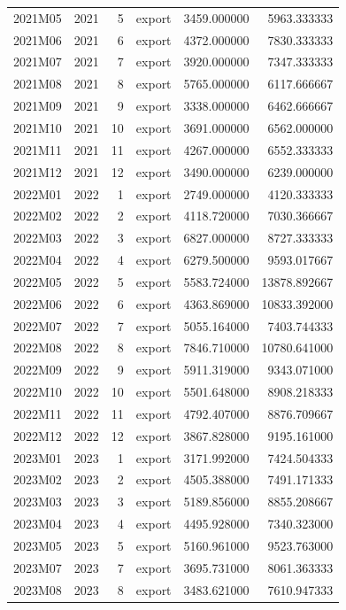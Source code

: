 \begin{tabular}{lrrlrr}
2021M05 & 2021 & 5 & export & 3459.000000 & 5963.333333 \\
2021M06 & 2021 & 6 & export & 4372.000000 & 7830.333333 \\
2021M07 & 2021 & 7 & export & 3920.000000 & 7347.333333 \\
2021M08 & 2021 & 8 & export & 5765.000000 & 6117.666667 \\
2021M09 & 2021 & 9 & export & 3338.000000 & 6462.666667 \\
2021M10 & 2021 & 10 & export & 3691.000000 & 6562.000000 \\
2021M11 & 2021 & 11 & export & 4267.000000 & 6552.333333 \\
2021M12 & 2021 & 12 & export & 3490.000000 & 6239.000000 \\
2022M01 & 2022 & 1 & export & 2749.000000 & 4120.333333 \\
2022M02 & 2022 & 2 & export & 4118.720000 & 7030.366667 \\
2022M03 & 2022 & 3 & export & 6827.000000 & 8727.333333 \\
2022M04 & 2022 & 4 & export & 6279.500000 & 9593.017667 \\
2022M05 & 2022 & 5 & export & 5583.724000 & 13878.892667 \\
2022M06 & 2022 & 6 & export & 4363.869000 & 10833.392000 \\
2022M07 & 2022 & 7 & export & 5055.164000 & 7403.744333 \\
2022M08 & 2022 & 8 & export & 7846.710000 & 10780.641000 \\
2022M09 & 2022 & 9 & export & 5911.319000 & 9343.071000 \\
2022M10 & 2022 & 10 & export & 5501.648000 & 8908.218333 \\
2022M11 & 2022 & 11 & export & 4792.407000 & 8876.709667 \\
2022M12 & 2022 & 12 & export & 3867.828000 & 9195.161000 \\
2023M01 & 2023 & 1 & export & 3171.992000 & 7424.504333 \\
2023M02 & 2023 & 2 & export & 4505.388000 & 7491.171333 \\
2023M03 & 2023 & 3 & export & 5189.856000 & 8855.208667 \\
2023M04 & 2023 & 4 & export & 4495.928000 & 7340.323000 \\
2023M05 & 2023 & 5 & export & 5160.961000 & 9523.763000 \\
2023M07 & 2023 & 7 & export & 3695.731000 & 8061.363333 \\
2023M08 & 2023 & 8 & export & 3483.621000 & 7610.947333 \\

\end{tabular}

